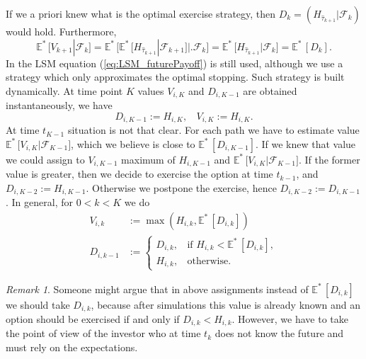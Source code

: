 \documentclass[a4paper,11pt, twoside]{book}
\theoremstyle{definition}
\theoremstyle{remark}
\newtheorem{remark}{Remark}[chapter]
\def\Em{{\mathbb{E}^*}\,}
\def\bpipe{{\bigl|\bigr.}}
\begin{document}
If we a priori knew what is the optimal exercise strategy, then $D_{k} = (H_{\hat{\tau}_{k+1}} | \mathcal{F}_{k})$ would hold. Furthermore,
\begin{equation}
 \label{eq:LSM_futurePayoff}
 \Em\bigl[ V_{k+1} | \mathcal{F}_{k} \bigr] = \Em\bigl[ \Em[H_{\hat{\tau}_{k+1}} | \mathcal{F}_{k+1}] \bpipe \mathcal{F}_{k} \bigr] = \Em\bigl[ H_{\hat{\tau}_{k+1}} | \mathcal{F}_k \bigr] = \Em[ D_{k} ]. 
\end{equation}
In the LSM equation (\ref{eq:LSM_futurePayoff}) is still used, although we use a strategy which only approximates the optimal stopping. Such strategy is built dynamically. At time point $K$ values $V_{i,K}$ and $D_{i,K-1}$ are obtained instantaneously, we have
\[ D_{i,K-1} := H_{i,K},\ \ \ \ V_{i,K} := H_{i,K}.\]
At time $t_{K-1}$ situation is not that clear. For each path we have to estimate value $\Em\bigl[ V_{i,K} | \mathcal{F}_{K-1} \bigr]$, which we believe is close to $\Em[D_{i,K-1}]$. If we knew that value we could assign to $V_{i,K-1}$ maximum of $H_{i,K-1}$ and $\Em\bigl[ V_{i,K} | \mathcal{F}_{K-1} \bigr]$. If the former value is greater, then we decide to exercise the option at time $t_{k-1}$, and $D_{i,K-2} := H_{i,K-1}$. Otherwise we postpone the exercise, hence $D_{i,K-2} := D_{i,K-1}$. In general, for $0 < k < K$ we do
\begin{align*}
 V_{i,k} &:= \max(H_{i,k}, \Em[D_{i,k}]) \\
 D_{i,k-1} &:= \begin{cases}
                 D_{i,k},\ \ \ \ \text{if } H_{i,k} < \Em[D_{i,k}], \\
                 H_{i,k},\ \ \ \ \text{otherwise.}
               \end{cases}
\end{align*}
\begin{remark}
 Someone might argue that in above assignments instead of $\Em[D_{i,k}]$ we should take $D_{i,k}$, because after simulations this value is already known and an option should be exercised if and only if $D_{i,k} < H_{i,k}$. However, we have to take the point of view of the investor who at time $t_k$ does not know the future and must rely on the expectations. 
\end{remark}
\end{document}
